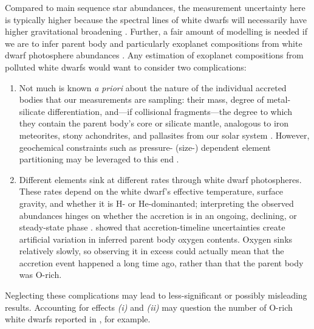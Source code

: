 Compared to main sequence star abundances, the measurement uncertainty here is typically higher because the spectral lines of white dwarfs will necessarily have higher gravitational broadening \citep[e.g.,][]{bonsor_hoststar_2021}. Further, a fair amount of modelling is needed if we are to infer parent body and particularly exoplanet compositions from white dwarf photosphere abundances \citep[e.g.,][]{harrison_polluted_2018, harrison_bayesian_2021, buchan_planets_2022}. Any estimation of exoplanet compositions from polluted white dwarfs would want to consider two complications:
\begin{enumerate}[label=(\roman*),font=\itshape]

\item Not much is known \textit{a priori} about the nature of the individual accreted bodies that our measurements are sampling: their mass, degree of metal-silicate differentiation, and---if collisional fragments---the degree to which they contain the parent body's core or silicate mantle, analogous to iron meteorites, stony achondrites, and pallasites from our solar system \citep{bonsor_are_2020, buchan_planets_2022}. However, geochemical constraints such as pressure- (size-) dependent element partitioning may be leveraged to this end \citep{buchan_planets_2022}.

\item Different elements sink at different rates through white dwarf photospheres. These rates depend on the white dwarf's effective temperature, surface gravity, and whether it is H- or He-dominanted; interpreting the observed abundances hinges on whether the accretion is in an ongoing, declining, or steady-state phase \citep{jura_extrasolar_2014}. \citet{brouwers_asynchronous_2023} showed that accretion-timeline uncertainties create artificial variation in inferred parent body oxygen contents. Oxygen sinks relatively slowly, so observing it in excess could actually mean that the accretion event happened a long time ago, rather than that the parent body was O-rich. 

\end{enumerate}
Neglecting these complications may lead to less-significant or possibly misleading results. Accounting for effects \textit{(i)} and \textit{(ii)} may question the number of O-rich white dwarfs reported in \citet{doyle_new_2023}, for example. %

